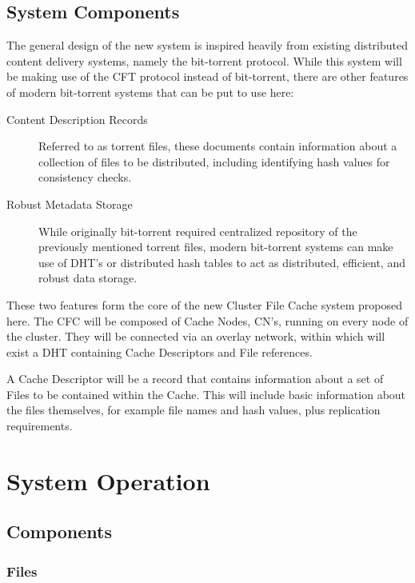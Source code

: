 \documentclass[letterpaper,11pt]{article}
\begin{document}
\subsection{System Components}

The general design of the new system is inspired heavily from existing distributed content delivery systems, namely the bit-torrent protocol. While this system will be making use of the CFT protocol instead of bit-torrent, there are other features of modern bit-torrent systems that can be put to use here:

\begin{description}
\item[Content Description Records] Referred to as torrent files, these documents contain information about a collection of files to be distributed, including identifying hash values for consistency checks.
\item[Robust Metadata Storage] While originally bit-torrent required centralized repository of the previously mentioned torrent files, modern bit-torrent systems can make use of DHT's or distributed hash tables to act as distributed, efficient, and robust data storage\cite{Maymounkov}.
\end{description}

These two features form the core of the new Cluster File Cache system proposed here. The CFC will be composed of Cache Nodes, CN's, running on every node of the cluster. They will be connected via an overlay network, within which will exist a DHT containing Cache Descriptors and File references.

A Cache Descriptor will be a record that contains information about a set of Files to be contained within the Cache. This will include basic information about the files themselves, for example file names and hash values, plus replication requirements.

\section{System Operation}

\subsection{Components}

\subsubsection{Files}
\end{document}
